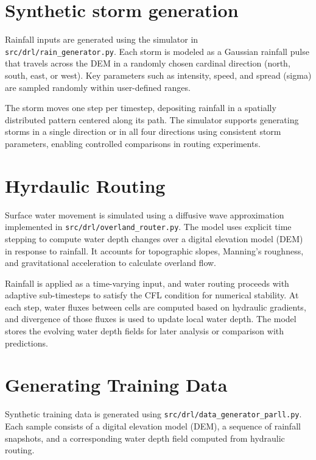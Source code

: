 \documentclass{article}
\begin{document}
\section{Synthetic storm generation}
\label{sec:storm}

Rainfall inputs are generated using the simulator in \texttt{src/drl/rain\_generator.py}. Each storm is modeled as a Gaussian rainfall pulse that travels across the DEM in a randomly chosen cardinal direction (north, south, east, or west). Key parameters such as intensity, speed, and spread (sigma) are sampled randomly within user-defined ranges.

The storm moves one step per timestep, depositing rainfall in a spatially distributed pattern centered along its path. The simulator supports generating storms in a single direction or in all four directions using consistent storm parameters, enabling controlled comparisons in routing experiments.

\section{Hyrdaulic Routing}
\label{sec:routing}

Surface water movement is simulated using a diffusive wave approximation implemented in \texttt{src/drl/overland\_router.py}. The model uses explicit time stepping to compute water depth changes over a digital elevation model (DEM) in response to rainfall. It accounts for topographic slopes, Manning's roughness, and gravitational acceleration to calculate overland flow.

Rainfall is applied as a time-varying input, and water routing proceeds with adaptive sub-timesteps to satisfy the CFL condition for numerical stability. At each step, water fluxes between cells are computed based on hydraulic gradients, and divergence of those fluxes is used to update local water depth. The model stores the evolving water depth fields for later analysis or comparison with predictions.

\section{Generating Training Data}
\label{sec:datagen}

Synthetic training data is generated using \texttt{src/drl/data\_generator\_parll.py}. Each sample consists of a digital elevation model (DEM), a sequence of rainfall snapshots, and a corresponding water depth field computed from hydraulic routing.
\end{document}
